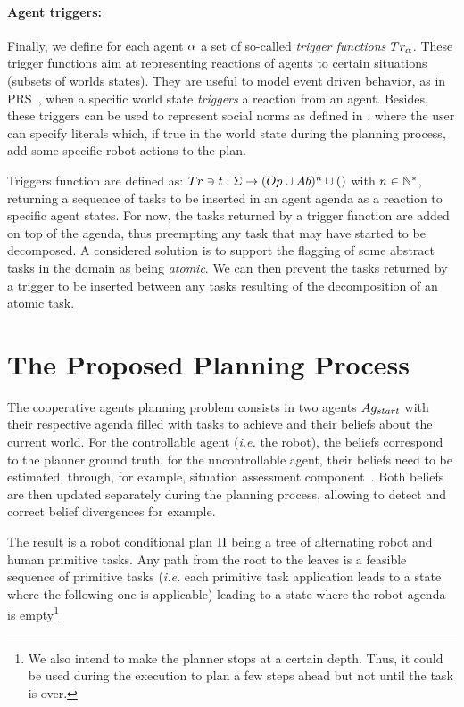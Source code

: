\documentclass[a4paper,11pt,twoside]{StyleThese}
\begin{document}
\paragraph{\bf Agent triggers:}
Finally, we define for each agent $\alpha$ a set of so-called \textit{trigger functions} $Tr_{\alpha}$. These trigger functions aim at representing reactions of agents to certain situations (subsets of worlds states). They are useful to model event driven behavior, as in PRS~\cite{ingrand1996prs}, when a specific world state \textit{triggers} a reaction from an agent. Besides, these triggers can be used to represent social norms as defined in \cite{carlucci2015explicit}, where the user can specify literals which, if true in the world state during the planning process, add some specific robot actions to the plan.

Triggers function are defined as: $Tr \ni t: \Sigma \rightarrow (Op \cup Ab)^n \cup ()$ with $n \in \mathbb{N}^*$, returning a sequence of tasks to be inserted in an agent agenda as a reaction to specific agent states. For now, the tasks returned by a trigger function are added on top of the agenda, thus preempting any task that may have started to be decomposed. A considered solution is to support the flagging of some abstract tasks in the domain as being \textit{atomic}. We can then prevent the tasks returned by a trigger to be inserted between any tasks resulting of the decomposition of an atomic task.

\section{The Proposed Planning Process}
The cooperative agents planning problem consists in two agents $Ag_{start}$ with their respective agenda filled with tasks to achieve and their beliefs about the current world. For the controllable agent (\textit{i.e.} the robot), the beliefs correspond to the planner ground truth, for the uncontrollable agent, their beliefs need to be estimated, through, for example, situation assessment component~\cite{milliez2014framework, lemaignan2018underworlds}. Both beliefs are then updated separately during the planning process, allowing to detect and correct belief divergences for example. 

The result is a robot conditional plan $\Pi$ being a tree of alternating robot and human primitive tasks. Any path from the root to the leaves is a feasible sequence of primitive tasks (\textit{i.e.} each primitive task application leads to a state where the following one is applicable) leading to a state where the robot agenda is empty\footnote{We also intend to make the planner stops at a certain depth. Thus, it could be used during the execution to plan a few steps ahead but not until the task is over.}
\end{document}
